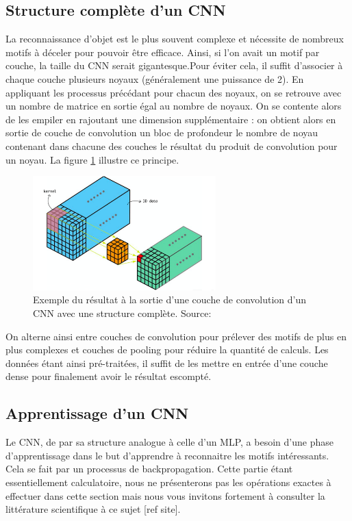 \subsection{Structure complète d'un CNN}

La reconnaissance d'objet est le plus souvent complexe et nécessite de nombreux motifs à déceler pour pouvoir être efficace. Ainsi, si l'on avait un motif par couche, la taille du CNN serait gigantesque.Pour éviter cela, il suffit d'associer à chaque couche plusieurs noyaux (généralement une puissance de 2). En appliquant les processus précédant pour chacun des noyaux, on se retrouve avec un nombre de matrice en sortie égal au nombre de noyaux. On se contente alors de les empiler en rajoutant une dimension supplémentaire : on obtient alors en sortie de couche de convolution un bloc de profondeur le nombre de noyau contenant dans chacune des couches  le résultat du produit de convolution pour un noyau. La figure \ref{structure_CNN_2} illustre ce principe.

\begin{figure}[!h]
\centering
\includegraphics[width=200pt]{images/cnn/structure_CNN_2.png}
\caption{Exemple du résultat à la sortie d'une couche de convolution d'un CNN avec une structure complète. Source:\cite{3D_convolution}}
\label{structure_CNN_2}
\end{figure}

On alterne ainsi entre couches de convolution pour prélever des motifs de plus en plus complexes et couches de pooling pour réduire la quantité de calculs. Les données étant ainsi pré-traitées, il suffit de les mettre en entrée d'une couche dense pour finalement avoir le résultat escompté.

\subsection{Apprentissage d'un CNN}

Le CNN, de par sa structure analogue à celle d'un MLP, a besoin d'une phase d'apprentissage dans le but d'apprendre à reconnaitre les motifs intéressants. Cela se fait par un processus de backpropagation. Cette partie étant essentiellement calculatoire, nous ne présenterons pas les opérations exactes à effectuer dans cette section mais nous vous invitons fortement à consulter la littérature scientifique à ce sujet [ref site].

